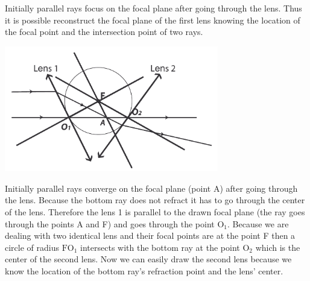 \hinteng
Initially parallel rays focus on the focal plane after going through the lens. Thus it is possible reconstruct the focal plane of the first lens knowing the location of the focal point and the intersection point of two rays.

\solueng
\begin{center}
\includegraphics[width=0.7\textwidth]{2014-lahg-07-optilineskeemlahendus_ing}
\end{center}
Initially parallel rays converge on the focal plane (point A) after going through the lens. Because the bottom ray does not refract it has to go through the center of the lens. Therefore the lens 1 is parallel to the drawn focal plane (the ray goes through the points A and F) and goes through the point $\text{O}_1$. Because we are dealing with two identical lens and their focal points are at the point F then a circle of radius $\text{FO}_1$ intersects with the bottom ray at the point $\text{O}_2$ which is the center of the second lens. Now we can easily draw the second lens because we know the location of the bottom ray’s refraction point and the lens’ center.
\probend